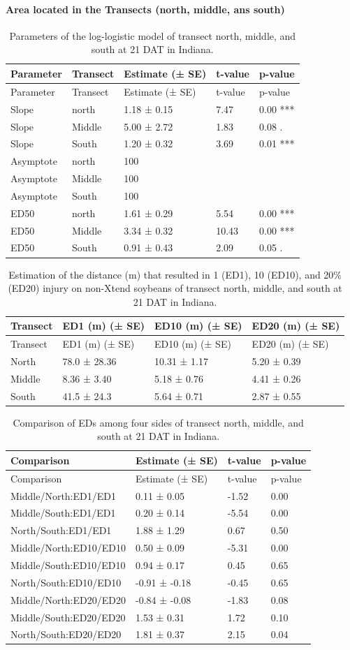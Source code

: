 \documentclass[]{article}
\let\oldparagraph\paragraph
\renewcommand{\paragraph}[1]{\oldparagraph{#1}\mbox{}}
\begin{document}
\newpage

\paragraph{\texorpdfstring{Area located in the \textbf{Transects}
(north, middle, ans
south)}{Area located in the Transects (north, middle, ans south)}}\label{area-located-in-the-transects-north-middle-ans-south}

\begin{longtable}[]{@{}lllll@{}}
\caption{Parameters of the log-logistic model of transect north, middle,
and south at 21 DAT in Indiana.}\tabularnewline
\toprule
Parameter & Transect & Estimate (± SE) & t-value &
p-value\tabularnewline
\midrule
\endfirsthead
\toprule
Parameter & Transect & Estimate (± SE) & t-value &
p-value\tabularnewline
\midrule
\endhead
Slope & north & 1.18 ± 0.15 & 7.47 & 0.00 ***\tabularnewline
Slope & Middle & 5.00 ± 2.72 & 1.83 & 0.08 .\tabularnewline
Slope & South & 1.20 ± 0.32 & 3.69 & 0.01 ***\tabularnewline
Asymptote & north & 100 & &\tabularnewline
Asymptote & Middle & 100 & &\tabularnewline
Asymptote & South & 100 & &\tabularnewline
ED50 & north & 1.61 ± 0.29 & 5.54 & 0.00 ***\tabularnewline
ED50 & Middle & 3.34 ± 0.32 & 10.43 & 0.00 ***\tabularnewline
ED50 & South & 0.91 ± 0.43 & 2.09 & 0.05 .\tabularnewline
\bottomrule
\end{longtable}

\begin{longtable}[]{@{}llll@{}}
\caption{Estimation of the distance (m) that resulted in 1 (ED1), 10
(ED10), and 20\% (ED20) injury on non-Xtend soybeans of transect north,
middle, and south at 21 DAT in Indiana.}\tabularnewline
\toprule
Transect & ED1 (m) (± SE) & ED10 (m) (± SE) & ED20 (m) (±
SE)\tabularnewline
\midrule
\endfirsthead
\toprule
Transect & ED1 (m) (± SE) & ED10 (m) (± SE) & ED20 (m) (±
SE)\tabularnewline
\midrule
\endhead
North & 78.0 ± 28.36 & 10.31 ± 1.17 & 5.20 ± 0.39\tabularnewline
Middle & 8.36 ± 3.40 & 5.18 ± 0.76 & 4.41 ± 0.26\tabularnewline
South & 41.5 ± 24.3 & 5.64 ± 0.71 & 2.87 ± 0.55\tabularnewline
\bottomrule
\end{longtable}

\begin{longtable}[]{@{}llll@{}}
\caption{Comparison of EDs among four sides of transect north, middle,
and south at 21 DAT in Indiana.}\tabularnewline
\toprule
Comparison & Estimate (± SE) & t-value & p-value\tabularnewline
\midrule
\endfirsthead
\toprule
Comparison & Estimate (± SE) & t-value & p-value\tabularnewline
\midrule
\endhead
Middle/North:ED1/ED1 & 0.11 ± 0.05 & -1.52 & 0.00\tabularnewline
Middle/South:ED1/ED1 & 0.20 ± 0.14 & -5.54 & 0.00\tabularnewline
North/South:ED1/ED1 & 1.88 ± 1.29 & 0.67 & 0.50\tabularnewline
Middle/North:ED10/ED10 & 0.50 ± 0.09 & -5.31 & 0.00\tabularnewline
Middle/South:ED10/ED10 & 0.94 ± 0.17 & 0.45 & 0.65\tabularnewline
North/South:ED10/ED10 & -0.91 ± -0.18 & -0.45 & 0.65\tabularnewline
Middle/North:ED20/ED20 & -0.84 ± -0.08 & -1.83 & 0.08\tabularnewline
Middle/South:ED20/ED20 & 1.53 ± 0.31 & 1.72 & 0.10\tabularnewline
North/South:ED20/ED20 & 1.81 ± 0.37 & 2.15 & 0.04\tabularnewline
\bottomrule
\end{longtable}
\end{document}
